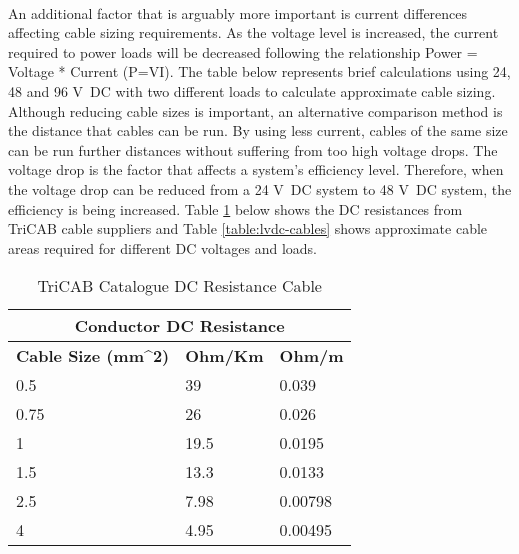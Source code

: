\paragraph{}
An additional factor that is arguably more important is current differences affecting cable sizing requirements. As the voltage level is increased, the current required to power loads will be decreased following the relationship Power = Voltage * Current (P=VI). The table below represents brief calculations using 24, 48 and 96 \si{V DC} with two different loads to calculate approximate cable sizing. Although reducing cable sizes is important, an alternative comparison method is the distance that cables can be run. By using less current, cables of the same size can be run further distances without suffering from too high voltage drops. The voltage drop is the factor that affects a system's efficiency level. Therefore, when the voltage drop can be reduced from a 24 \si{V DC} system to 48 \si{V DC} system, the efficiency is being increased. Table \ref{table:DC-Resistances} below shows the DC resistances from TriCAB cable suppliers \cite{website:triCAB} and Table \ref{table:lvdc-cables} shows approximate cable areas required for different DC voltages and loads.

\begin{table}[H]
\centering
\begin{tabular}{|l|l|l|}
\hline
\multicolumn{3}{|c|}{\textbf{Conductor DC Resistance}}                                                                                        \\ \hline
\multicolumn{1}{|c|}{\textbf{Cable Size (mm\textasciicircum 2)}} & \multicolumn{1}{c|}{\textbf{Ohm/Km}} & \multicolumn{1}{c|}{\textbf{Ohm/m}} \\ \hline
0.5                                                              & 39                                   & 0.039                               \\ \hline
0.75                                                             & 26                                   & 0.026                               \\ \hline
1                                                                & 19.5                                 & 0.0195                              \\ \hline
1.5                                                              & 13.3                                 & 0.0133                              \\ \hline
2.5                                                              & 7.98                                 & 0.00798                             \\ \hline
4                                                                & 4.95                                 & 0.00495 \\ 
\hline     
\end{tabular}
\caption{TriCAB Catalogue DC Resistance Cable \cite{website:triCAB}}
\label{table:DC-Resistances}
\end{table}

